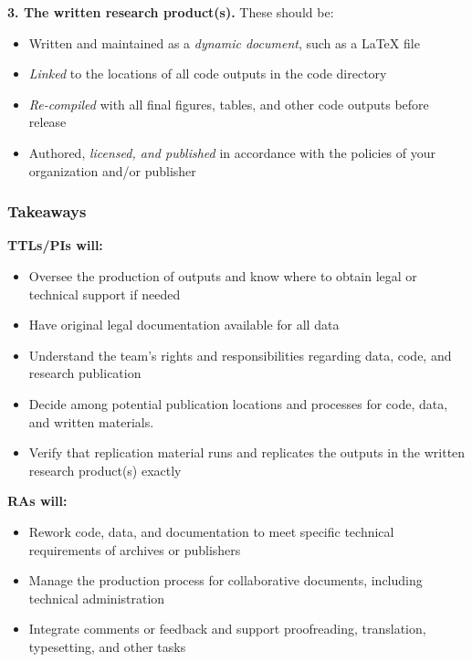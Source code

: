 \documentclass[
]{book}
\providecommand{\tightlist}{%
  \setlength{\itemsep}{0pt}\setlength{\parskip}{0pt}}
\begin{document}
\begin{summary}
\textbf{3. The written research product(s).} These should be:

\begin{itemize}
\tightlist
\item
  Written and maintained as a \emph{dynamic document}, such as a LaTeX file
\item
  \emph{Linked} to the locations of all code outputs in the code directory
\item
  \emph{Re-compiled} with all final figures, tables, and other code outputs before release
\item
  Authored, \emph{licensed, and published} in accordance with the policies of your organization and/or publisher
\end{itemize}

\hypertarget{takeaways-6}{%
\subsubsection*{Takeaways}\label{takeaways-6}}

\textbf{TTLs/PIs will:}

\begin{itemize}
\tightlist
\item
  Oversee the production of outputs and know where to obtain legal or technical support if needed
\item
  Have original legal documentation available for all data
\item
  Understand the team's rights and responsibilities regarding data, code, and research publication
\item
  Decide among potential publication locations and processes for code, data, and written materials.
\item
  Verify that replication material runs and replicates the outputs in the written research product(s) exactly
\end{itemize}

\textbf{RAs will:}

\begin{itemize}
\tightlist
\item
  Rework code, data, and documentation to meet specific technical requirements of archives or publishers
\item
  Manage the production process for collaborative documents, including technical administration
\item
  Integrate comments or feedback and support proofreading, translation, typesetting, and other tasks
\end{itemize}


\end{summary}
\end{document}
